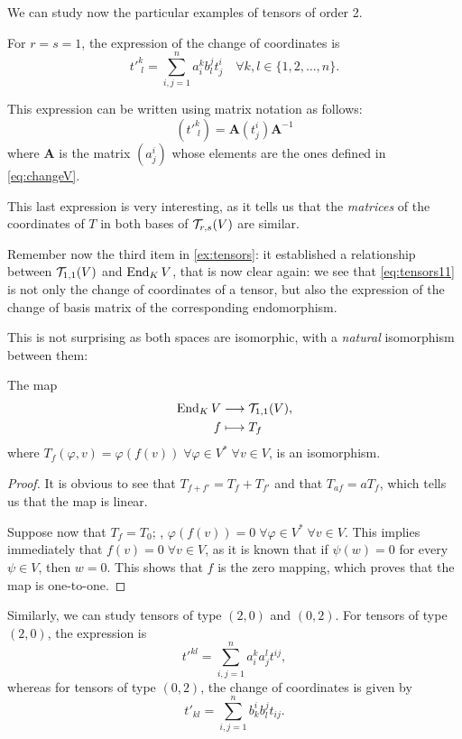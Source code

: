 We can study now the particular examples of tensors of order 2.

For $r = s = 1$, the expression of the change of coordinates is
\[
	t'^k_{\phantom{'}l} = \sum_{i,j = 1}^n a^k_i b_l^j  t^i_j \quad \forall k,l \in \{1,2,\dots,n\}.
\]

This expression can be written using matrix notation as follows:
\begin{equation}
	\label{eq:tensors11}
	(t'^k_{\phantom{'}l}) = \mathbf{A} (t^i_j) \mathbf{A}^{-1}
\end{equation}
where $\mathbf{A}$ is the matrix $\left(a_j^i\right)$ whose elements are the ones defined in \autoref{eq:changeV}.

This last expression is very interesting, as it tells us that the \emph{matrices} of the coordinates of $T$ in both bases of ${\mathcal T}_{r,s}(V)$ are similar.

Remember now the third item in \autoref{ex:tensors}: it established a relationship between ${\mathcal T}_{1,1}(V)$ and $\operatorname{End}_K V$, that is now clear again: we see that \autoref{eq:tensors11} is not only the change of coordinates of a tensor, but also the expression of the change of basis matrix of the corresponding endomorphism.

This is not surprising as both spaces are isomorphic, with a \emph{natural} isomorphism between them:
\begin{theorem}
	The map
	\begin{align*}
		\operatorname{End}_K V &\longrightarrow {\mathcal T}_{1,1}(V),\\
		f &\longmapsto T_f
	\end{align*}
	where $T_f(\varphi, v) = \varphi(f(v)) \; \forall \varphi \in V^* \; \forall v \in V$, is an isomorphism.
\end{theorem}
\begin{proof}
	It is obvious to see that $T_{f+f'} = T_f +T_{f'}$ and that $T_{af} = aT_f$, which tells us that the map is linear.
	
	Suppose now that $T_f = T_0$; \ie, $\varphi(f(v)) = 0 \; \forall \varphi \in V^* \; \forall v \in V$. This implies immediately that $f(v) = 0 \; \forall v \in V$, as it is known that if $\psi(w) = 0$ for every $\psi \in V$, then $w = 0$. This shows that $f$ is the zero mapping, which proves that the map is one-to-one.
\end{proof}

Similarly, we can study tensors of type $(2,0)$ and $(0,2)$. For tensors of type $(2,0)$, the expression is
\[
	t'^{kl} = \sum_{i,j=1}^n a_i^k a_j^l t^{ij},
\]
whereas for tensors of type $(0,2)$, the change of coordinates is given by
\[
	t'_{kl} = \sum_{i,j=1}^n b_k^i b_l^j t_{ij}.
\]

